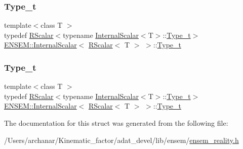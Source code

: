 \subsubsection{\texorpdfstring{Type\_t}{Type\_t}\hspace{0.1cm}{\footnotesize\ttfamily [1/2]}}
{\footnotesize\ttfamily template$<$class T $>$ \\
typedef \mbox{\hyperlink{classENSEM_1_1RScalar}{R\+Scalar}}$<$typename \mbox{\hyperlink{structENSEM_1_1InternalScalar}{Internal\+Scalar}}$<$T$>$\+::\mbox{\hyperlink{structENSEM_1_1InternalScalar_3_01RScalar_3_01T_01_4_01_4_a2acb8111a19ee425e0751d1355d5151e}{Type\+\_\+t}}$>$ \mbox{\hyperlink{structENSEM_1_1InternalScalar}{E\+N\+S\+E\+M\+::\+Internal\+Scalar}}$<$ \mbox{\hyperlink{classENSEM_1_1RScalar}{R\+Scalar}}$<$ T $>$ $>$\+::\mbox{\hyperlink{structENSEM_1_1InternalScalar_3_01RScalar_3_01T_01_4_01_4_a2acb8111a19ee425e0751d1355d5151e}{Type\+\_\+t}}}

\mbox{\label{structENSEM_1_1InternalScalar_3_01RScalar_3_01T_01_4_01_4_a2acb8111a19ee425e0751d1355d5151e}} 
\subsubsection{\texorpdfstring{Type\_t}{Type\_t}\hspace{0.1cm}{\footnotesize\ttfamily [2/2]}}
{\footnotesize\ttfamily template$<$class T $>$ \\
typedef \mbox{\hyperlink{classENSEM_1_1RScalar}{R\+Scalar}}$<$typename \mbox{\hyperlink{structENSEM_1_1InternalScalar}{Internal\+Scalar}}$<$T$>$\+::\mbox{\hyperlink{structENSEM_1_1InternalScalar_3_01RScalar_3_01T_01_4_01_4_a2acb8111a19ee425e0751d1355d5151e}{Type\+\_\+t}}$>$ \mbox{\hyperlink{structENSEM_1_1InternalScalar}{E\+N\+S\+E\+M\+::\+Internal\+Scalar}}$<$ \mbox{\hyperlink{classENSEM_1_1RScalar}{R\+Scalar}}$<$ T $>$ $>$\+::\mbox{\hyperlink{structENSEM_1_1InternalScalar_3_01RScalar_3_01T_01_4_01_4_a2acb8111a19ee425e0751d1355d5151e}{Type\+\_\+t}}}



The documentation for this struct was generated from the following file\+:\begin{DoxyCompactItemize}
\item 
/\+Users/archanar/\+Kinematic\+\_\+factor/adat\+\_\+devel/lib/ensem/\mbox{\hyperlink{lib_2ensem_2ensem__reality_8h}{ensem\+\_\+reality.\+h}}\end{DoxyCompactItemize}

